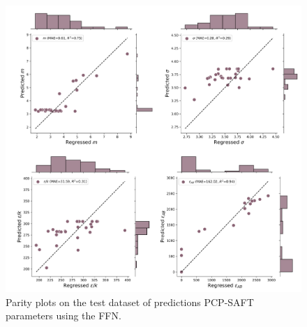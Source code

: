 \begin{figure}
    \centering
    \includegraphics[width=\textwidth]{gfx/Chapter07/ffn_parity_plots.png}
    \caption{Parity plots on the test dataset of predictions PCP-SAFT parameters using the FFN.}
    \label{fig:ffn}
\end{figure}